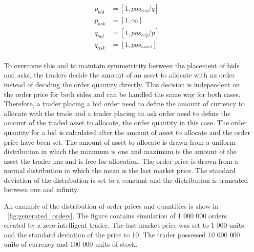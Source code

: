 \begin{equation}
\begin{aligned}
p_{bid} &= \left[1, pos_{ccy} / q \right] \\
p_{ask} &= \left[1, \infty \right] \\
q_{bid} &= \left[1, pos_{ccy} / p\right] \\
q_{ask} &= \left[1, pos_{asset}\right] \\
\end{aligned}
\label{eq:feasible_ranges}
\end{equation}

To overcome this and to maintain symmetricity between the placement of bids and asks, 
the traders decide the amount of an asset to allocate with an order instead of deciding 
the order quantity directly. This decision is independent on the order price for both
sides and can be handled the same way for both cases. Therefore, a trader placing a bid order 
need to define the amount of currency to allocate with the trade and a trader placing an ask
order need to define the amount of the traded asset to allocate, the order quantity in this case. 
The order quantity for a bid is calculated after the amount of asset to allocate 
and the order price have been set. The amount of asset to allocate is drawn from a uniform
distribution in which the minimum is one and maximum is the amount of the asset the trader
has and is free for allocation. The order price is drawn from a normal distribution in which 
the mean is the last market price. The standard deviation of the distribution is set to a 
constant and the distribution is truncated between one and infinity.


An example of the distribution of order prices and quantities
is show in ~\ref{fig:generated_orders}. The figure contains simulation
of 1 000 000 orders created by a zero-intelligent trader. 
The last market price was set to 1 000 units and the standard deviation of the price to 10. 
The trader possessed 10 000 000 units of currency and 100 000 
units of stock.

